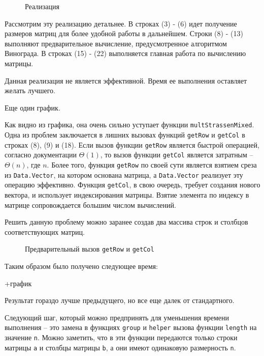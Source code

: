 \documentclass[a4paper,12pt,russian]{article}
\begin{document}
	\begin{figure}[H]
		\caption{Реализация}
		
	\end{figure}
	
	Рассмотрим эту реализацию детальнее. В строках (3) - (6) идет получение размеров матриц для более удобной работы в дальнейшем. Строки (8) - (13) выполняют предварительное вычисление, предусмотренное алгоритмом Винограда. В строках (15) - (22) выполняется главная работа по вычислению матрицы.
	
	Данная реализация не является эффективной. Время ее выполнения оставляет желать лучшего.
	
	Еще один график.
	
	Как видно из графика, она очень сильно уступает функции \texttt{multStrassenMixed}. Одна из проблем заключается в лишних вызовах функций \texttt{getRow} и \texttt{getCol} в строках (8), (9) и (18). Если вызов функции \texttt{getRow} является быстрой операцией, согласно документации \(\Theta(1)\), то вызов функции \texttt{getCol} является затратным -- \(\Theta(n)\), где \(n\). Более того, функция \texttt{getRow} по своей сути является взятием среза из \texttt{Data.Vector}, на котором основана матрица, а \texttt{Data.Vector} реализует эту операцию эффективно. Функция \texttt{getCol}, в свою очередь, требует создания нового вектора, и использует индексирования матрицы. Взятие элемента по индексу в матрице сопровождается большим числом вычислений.
	
	Решить данную проблему можно заранее создав два массива строк и столбцов соответствующих матриц.
	
	\begin{figure}[H]
		\caption{Предварительный вызов \texttt{getRow} и \texttt{getCol}}
		
	\end{figure}
	
	Таким образом было получено следующее время:
	
	+график
	
	Результат гораздо лучше предыдущего, но все еще далек от стандартного.
	
	Следующий шаг, который можно предпринять для уменьшения времени выполнения -- это замена в функциях \texttt{group} и \texttt{helper} вызова функции \texttt{length} на значение \texttt{n}. Можно заметить, что в эти функции передаются только строки матрицы \texttt{a} и столбцы матрицы \texttt{b}, а они имеют одинаковую размерность \texttt{n}. 
	
\end{document}
